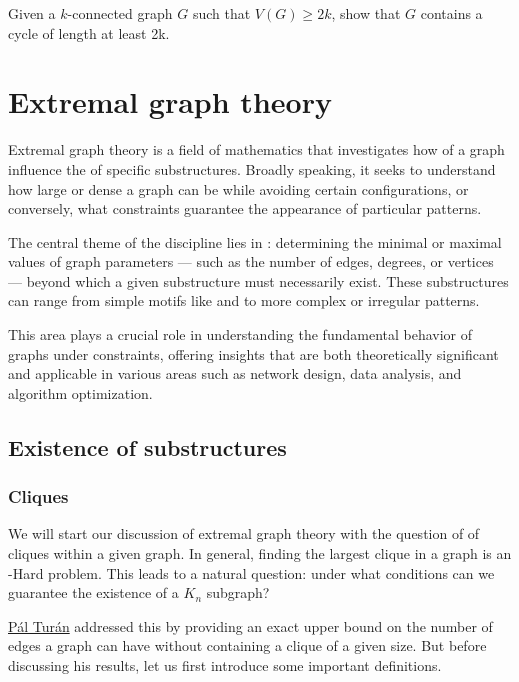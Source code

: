 \documentclass[a4paper, 12pt]{report}
\begin{document}
    \begin{framedprob}{}
        Given a $k$-connected graph $G$ such that $V(G) \ge 2k$, show that $G$ contains a cycle of length at least 2k.
    \end{framedprob}


    \chapter{Extremal graph theory}

    Extremal graph theory is a field of mathematics that investigates how  of a graph influence the  of specific substructures. Broadly speaking, it seeks to understand how large or dense a graph can be while avoiding certain configurations, or conversely, what constraints guarantee the appearance of particular patterns.

    The central theme of the discipline lies in : determining the minimal or maximal values of graph parameters --- such as the number of edges, degrees, or vertices --- beyond which a given substructure must necessarily exist. These substructures can range from simple motifs like  and  to more complex or irregular patterns.

    This area plays a crucial role in understanding the fundamental behavior of graphs under constraints, offering insights that are both theoretically significant and applicable in various areas such as network design, data analysis, and algorithm optimization.

    \section{Existence of substructures}

    \subsection{Cliques}

    We will start our discussion of extremal graph theory with the question of  of cliques within a given graph. In general, finding the largest clique in a graph is an \NPclass-Hard problem. This leads to a natural question: under what conditions can we guarantee the existence of a $K_n$ subgraph?

    \href{https://en.wikipedia.org/wiki/P%C3%A1l_Tur%C3%A1n}{Pál Turán} addressed this by providing an exact upper bound on the number of edges a graph can have without containing a clique of a given size. But before discussing his results, let us first introduce some important definitions.
\end{document}
